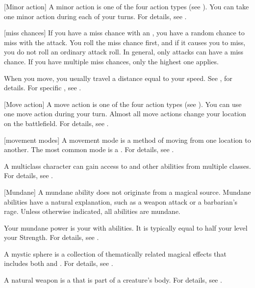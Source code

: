 [Minor action] A minor action is one of the four action types (see ).
You can take one minor action during each of your turns.
For details, see .

[miss chances] If you have a miss chance with an , you have a random chance to miss with the attack.
You roll the miss chance first, and if it causes you to miss, you do not roll an ordinary attack roll.
In general, only  attacks can have a miss chance.
If you have multiple miss chances, only the highest one applies.

 When you move, you usually travel a distance equal to your speed.
See , for details.
For specific , see .

[Move action] A move action is one of the four action types (see ).
You can use one move action during your turn.
Almost all move actions change your location on the battlefield.
For details, see .

[movement modes] A movement mode is a method of moving from one location to another.
The most common mode is a .
For details, see .

 A multiclass character can gain access to  and other abilities from multiple classes.
For details, see .

[Mundane] A mundane ability does not originate from a magical source.
Mundane abilities have a natural explanation, such as a weapon attack or a barbarian's rage.
Unless otherwise indicated, all abilities are mundane.

 Your mundane power is your  with  abilities.
It is typically equal to half your level \add your Strength.
For details, see .

 A mystic sphere is a collection of thematically related magical effects that includes both  and .
For details, see .

 A natural weapon is a  that is part of a creature's body.
For details, see .

